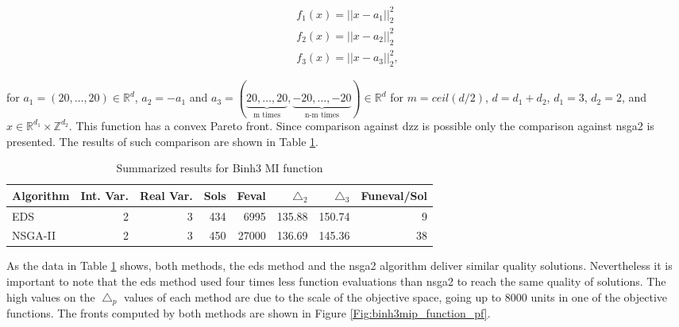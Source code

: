 \begin{eqnarray}
f_1(x) = || x - a_1 ||_2^2 \nonumber \\
f_2(x) = || x - a_2 ||_2^2 \\
f_3(x) = || x - a_3 ||_2^2,\nonumber
\label{eq:f3d_mip_fun}
\end{eqnarray}

for $a_1 = (20, \ldots, 20) \in \mathbb{R}^d$, $a_2 = -a_1$ and $a_3 = (\underbrace{20, \ldots, 20}_\text{m times}, \underbrace{-20, \ldots, -20}_\text{n-m times}) \in \mathbb{R}^d$ for $m = ceil(d/2)$, $d = d_1 + d_2$, $d_1 = 3$, $d_2 = 2$, and $x \in \mathbb{R}^{d_1} \times \mathbb{Z}^{d_2}$. This function has a convex Pareto front. Since comparison against \gls{dzz} is possible only the comparison against \gls{nsga2} is presented. The results of such comparison are shown in Table \ref{table:results_binh3mip}.

\begin{table}[!htb]
\centering
\begin{tabular}{| l  r  r  r  r  r  r  r |}
	\hline
	Algorithm & Int. Var. & Real Var. & Sols & Feval & $\triangle_2$ & $\triangle_3$ & Funeval/Sol\\  
  	\hline
  	EDS & 2 & 3  & 434 & 6995  & 135.88 & 150.74 & 9\\
  	NSGA-II & 2 & 3 & 450 & 27000  & 136.69 & 145.36 & 38\\
  	\hline
\end{tabular}
\caption{Summarized results for Binh3 MI function}
\label{table:results_binh3mip}
\end{table}

As the data in Table \ref{table:results_binh3mip} shows, both methods, the \gls{eds} method and the \gls{nsga2} algorithm deliver similar quality solutions. Nevertheless it is important to note that the \gls{eds} method used four times less function evaluations than \gls{nsga2} to reach the same quality of solutions. The high values on the $\bigtriangleup_p$ values of each method are due to the scale of the objective space, going up to 8000 units in one of the objective functions. The fronts computed by both methods are shown in Figure \ref{Fig:binh3mip_function_pf}.

\begin{comment}

 \begin{figure}[H]
 	\centering
	\hspace*{-0.5in}
    \subfloat[EDS]{%
      \texttt{[image: img/fronts/pf\_f3dmip\_eds.png]}
    }
    \subfloat[NSGA-II]{%
      \texttt{[image: img/fronts/pf\_f3dmip\_ga.png]}
    }
    \caption{Pareto fronts of the Binh3 MI function computed by the different methods}
    \label{Fig:binh3mip_function_pf}
\end{figure}

\end{comment}

